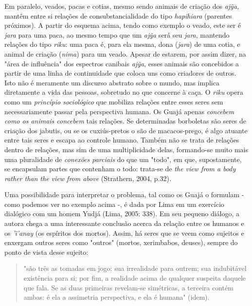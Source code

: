 Em paralelo, veados, pacas e cotias, mesmo sendo animais de criação dos
\emph{ajỹa,} mantêm entre si relações de consubstancialidade do tipo
\emph{hapihiara} (parentes próximos). A partir do esquema acima, tendo
como exemplo o veado, este ser é \emph{jara} para uma paca, ao mesmo
tempo que um \emph{ajỹa} será seu \emph{jara}, mantendo relações do tipo
\emph{riku}: uma paca é, para ela mesma, dona (\emph{jara}) de uma
cotia, e animal de criação (\emph{nima}) para um veado. Apesar de
estarem, por assim dizer, na "área de influência" dos espectros canibais
\emph{ajỹa}, esses animais são concebidos a partir de uma linha de
continuidade que coloca uns como criadores de outros. Isto não é
meramente um discurso abstrato sobre o mundo, mas implica diretamente a
vida das pessoas, sobretudo no que concerne à caça. O \emph{riku} opera
como um \emph{princípio sociológico} que mobiliza relações entre esses
seres sem necessariamente passar pela perspectiva humana. Os Guajá
apenas \emph{concebem} \emph{como os animais concebem} tais relações. Se
determinadas borboletas são seres de criação dos jabutis, ou se os
cuxiús-pretos o são de macacos-prego, é algo atuante entre tais seres e
escapa ao controle humano. Também não se trata de relações dentro de
relações, mas sim de uma multiplicidade delas, formando-se muito mais
uma pluralidade de \emph{conexões parciais} do que um "todo", em que,
supostamente, se encapsulam partes que contenham o todo: trata-se de
\emph{the view from a body rather than the view from above} (Strathern,
2004, p.32)\emph{.}

Uma possibilidade para interpretar o problema, tal como os Guajá o
formulam - como podemos ver no exemplo acima -, é dada por Lima em um
exercício dialógico com um homem Yudjá (Lima, 2005: 338). Em seu pequeno
diálogo, a autora chega a uma interessante conclusão acerca da relação
entre os humanos e os \emph{'ï'anay} (os espíritos dos mortos). Assim,
há seres que se veem como sujeitos e enxergam outros seres como "outros"
(mortos, xerimbabos, deuses), sempre do ponto de vista desse sujeito:

\begin{quote}
"são três as tomadas em jogo: sua irrealidade para outrem; sua
indubitável existência para si; por fim, a realidade acima de qualquer
suspeita daquele que fala. Se as duas primeiras revelam-se simétricas, a
terceira contém ambas: é ela a assimetria perspectiva, e ela é humana"
(idem).
\end{quote}

